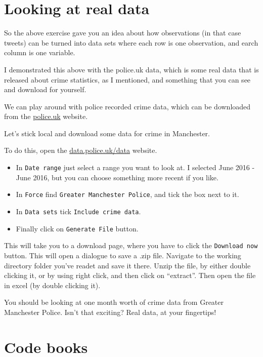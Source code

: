 \documentclass[]{book}
\providecommand{\tightlist}{%
  \setlength{\itemsep}{0pt}\setlength{\parskip}{0pt}}
\theoremstyle{definition}
\theoremstyle{definition}
\theoremstyle{definition}
\theoremstyle{remark}
\begin{document}
\hypertarget{looking-at-real-data}{%
\section{Looking at real data}\label{looking-at-real-data}}

So the above exercise gave you an idea about how observations (in that
case tweets) can be turned into data sets where each row is one
observation, and earch column is one variable.

I demonstrated this above with the police.uk data, which is some real
data that is released about crime statistics, as I mentioned, and
something that you can see and download for yourself.

We can play around with police recorded crime data, which can be
downloaded from the \href{https://data.police.uk/data/}{police.uk}
website.

Let's stick local and download some data for crime in Manchester.

To do this, open the
\href{https://data.police.uk/data/}{data.police.uk/data} website.

\begin{itemize}
\tightlist
\item
  In \texttt{Date\ range} just select a range you want to look at. I
  selected June 2016 - June 2016, but you can choose something more
  recent if you like.
\item
  In \texttt{Force} find \texttt{Greater\ Manchester\ Police}, and tick
  the box next to it.
\item
  In \texttt{Data\ sets} tick \texttt{Include\ crime\ data}.
\item
  Finally click on \texttt{Generate\ File} button.
\end{itemize}

This will take you to a download page, where you have to click the
\texttt{Download\ now} button. This will open a dialogue to save a .zip
file. Navigate to the working directory folder you've readet and save it
there. Unzip the file, by either double clicking it, or by using right
click, and then click on ``extract''. Then open the file in excel (by
double clicking it).

You should be looking at one month worth of crime data from Greater
Manchester Police. Isn't that exciting? Real data, at your fingertips!

\hypertarget{code-books}{%
\section{Code books}\label{code-books}}
\end{document}
